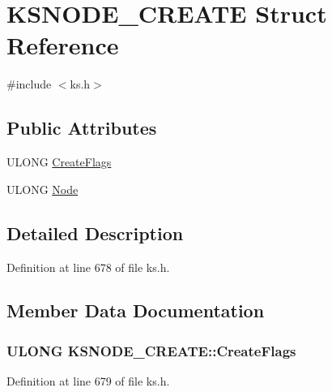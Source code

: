 \hypertarget{struct_k_s_n_o_d_e___c_r_e_a_t_e}{}\section{K\+S\+N\+O\+D\+E\+\_\+\+C\+R\+E\+A\+TE Struct Reference}
\label{struct_k_s_n_o_d_e___c_r_e_a_t_e}


{\ttfamily \#include $<$ks.\+h$>$}

\subsection*{Public Attributes}
\begin{DoxyCompactItemize}
\item 
U\+L\+O\+NG \hyperlink{struct_k_s_n_o_d_e___c_r_e_a_t_e_a19a75f781b3040a080fa5ea0b1e5d1bb}{Create\+Flags}
\item 
U\+L\+O\+NG \hyperlink{struct_k_s_n_o_d_e___c_r_e_a_t_e_a197de82f5566cd0d2d7d84e6fefaa1f4}{Node}
\end{DoxyCompactItemize}


\subsection{Detailed Description}


Definition at line 678 of file ks.\+h.



\subsection{Member Data Documentation}
\subsubsection[{\texorpdfstring{Create\+Flags}{CreateFlags}}]{\setlength{\rightskip}{0pt plus 5cm}U\+L\+O\+NG K\+S\+N\+O\+D\+E\+\_\+\+C\+R\+E\+A\+T\+E\+::\+Create\+Flags}\hypertarget{struct_k_s_n_o_d_e___c_r_e_a_t_e_a19a75f781b3040a080fa5ea0b1e5d1bb}{}\label{struct_k_s_n_o_d_e___c_r_e_a_t_e_a19a75f781b3040a080fa5ea0b1e5d1bb}


Definition at line 679 of file ks.\+h.

